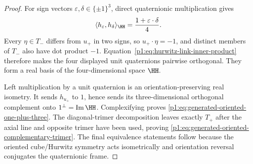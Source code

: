 \documentclass[11pt]{article}
\begin{document}
\begin{proof}
For sign vectors \(\varepsilon,\delta\in\{\pm1\}^3\), direct quaternionic
multiplication gives
\begin{equation}
\label{p1:eq:hurwitz-link-inner-product}
 \langle h_\varepsilon,h_\delta\rangle_{\HH}
 =\frac{1+\varepsilon\cdot\delta}{4}.
\end{equation}
Every \(\eta\in T_-\) differs from \(u_+\) in two signs, so
\(u_+\cdot\eta=-1\), and distinct members of \(T_-\) also have dot product
\(-1\).  Equation~\eqref{p1:eq:hurwitz-link-inner-product} therefore makes
the four displayed unit quaternions pairwise orthogonal.  They form a real
basis of the four-dimensional space \(\HH\).

Left multiplication by a unit quaternion is an orientation-preserving real
isometry.  It sends \(h_{u_+}\) to \(1\), hence sends its three-dimensional
orthogonal complement onto \(1^\perp=\operatorname{Im}\HH\).  Complexifying
proves \eqref{p1:eq:generated-oriented-one-plus-three}.  The diagonal-trimer
decomposition leaves exactly \(T_+\) after the axial line and opposite trimer
have been used, proving \eqref{p1:eq:generated-oriented-complementary-trimer}.
The final equivalence statements follow because the oriented cube/Hurwitz
symmetry acts isometrically and orientation reversal conjugates the
quaternionic frame.
\end{proof}
\end{document}
